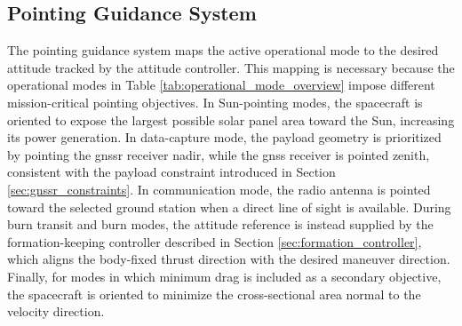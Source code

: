 \subsection{Pointing Guidance System}
\label{sec:pointing_guidance}
The pointing guidance system maps the active operational mode to the desired attitude tracked by the attitude controller. This mapping is necessary because the operational modes in Table \ref{tab:operational_mode_overview} impose different mission-critical pointing objectives. In Sun-pointing modes, the spacecraft is oriented to expose the largest possible solar panel area toward the Sun, increasing its power generation. In data-capture mode, the payload geometry is prioritized by pointing the \gls{gnssr} receiver nadir, while the \gls{gnss} receiver is pointed zenith, consistent with the payload constraint introduced in Section \ref{sec:gnssr_constraints}. In communication mode, the radio antenna is pointed toward the selected ground station when a direct line of sight is available. During burn transit and burn modes, the attitude reference is instead supplied by the formation-keeping controller described in Section \ref{sec:formation_controller}, which aligns the body-fixed thrust direction with the desired maneuver direction. Finally, for modes in which minimum drag is included as a secondary objective, the spacecraft is oriented to minimize the cross-sectional area normal to the velocity direction.


